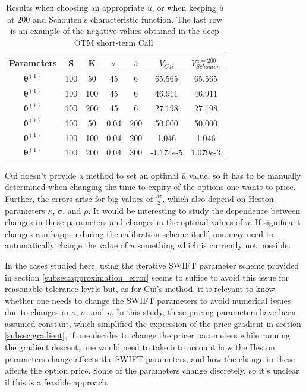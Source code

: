 \documentclass[12,twoside]{mammeTFM}
\theoremstyle{definition}
\theoremstyle{remark}
\begin{document}
\begin{table}[!h]
\begin{center}
 \begin{tabular}{|c | c | c | c | c | c | c |} 
 \hline
 Parameters & S & K & $\tau$ & $\overline{u}$ & $V_{Cui}$ & $V_{Schouten}^{\overline{u} = 200}$ \\ [0.5ex] 
 \hline
 $\boldsymbol{\theta}^{(1)}$ & 100 & 50  & 45  & 6 & 65.565 & 65.565 \\ 
 \hline
 $\boldsymbol{\theta}^{(1)}$ & 100 & 100 & 45   & 6 & 46.911 & 46.911 \\ 
 \hline
 $\boldsymbol{\theta}^{(1)}$ & 100 & 200 & 45   & 6 & 27.198 & 27.198 \\ 
 \hline
 $\boldsymbol{\theta}^{(1)}$ & 100 & 50  & 0.04 & 200 & 50.000 & 50.000 \\ 
 \hline
 $\boldsymbol{\theta}^{(1)}$ & 100 & 100 & 0.04 & 200 & 1.046 & 1.046 \\ 
 \hline
 $\boldsymbol{\theta}^{(1)}$ & 100 & 200 & 0.04 & 300 & -1.174e-5 & 1.079e-3 \\
 \hline
\end{tabular}
\end{center}
\caption{Results when choosing an appropriate $\overline{u}$, or when keeping $\overline{u}$ at 200 and Schouten's characteristic function. The last row is an example of the negative values obtained in the deep OTM short-term Call.}
\end{table}

Cui doesn't provide a method to set an optimal $\overline{u}$ value, so it has to be manually determined when changing the time to expiry of the options one wants to price. Further, the errors arise for big values of $\frac{d \tau}{2}$, which also depend on Heston parameters $\kappa$, $\sigma$, and $\rho$. It would be interesting to study the dependence between changes in these parameters and changes in the optimal values of $\overline{u}$. If significant changes can happen during the calibration scheme itself, one may need to automatically change the value of $\overline{u}$ something which is currently not possible.

In the cases studied here, using the iterative SWIFT parameter scheme provided in section \ref{subsec:approximation_error} seems to suffice to avoid this issue for reasonable tolerance levels but, as for Cui's method, it is relevant to know whether one needs to change the SWIFT parameters to avoid numerical issues due to changes in $\kappa$, $\sigma$, and $\rho$. In this study, these pricing parameters have been assumed constant, which simplified the expression of the price gradient in section \ref{subsec:gradient}, if one decides to change the pricer parameters while running the gradient descent, one would need to take into account how the Heston parameters change affects the SWIFT parameters, and how the change in these affects the option price. Some of the parameters change discretely, so it's unclear if this is a feasible approach.
\end{document}
